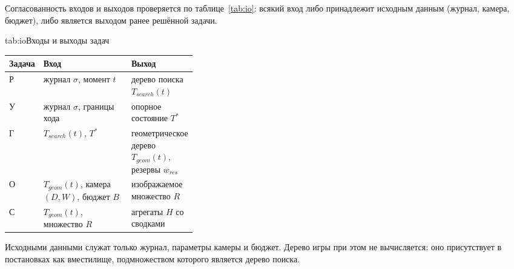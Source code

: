 Согласованность входов и выходов проверяется по таблице~\ref{tab:io}: всякий
вход либо принадлежит исходным данным (журнал, камера, бюджет), либо
является выходом ранее решённой задачи.

\begin{gosttable}{tab:io}{Входы и выходы задач}
\begin{tabularx}{\linewidth}{>{\raggedright\arraybackslash}p{0.10\linewidth}>{\raggedright\arraybackslash}X>{\raggedright\arraybackslash}p{0.26\linewidth}}
\hline
Задача & Вход & Выход \\
\hline
Р & журнал $\sigma$, момент $t$ & дерево поиска $T_{search}(t)$ \\
\hline
У & журнал $\sigma$, границы хода & опорное состояние $T^{*}$ \\
\hline
Г & $T_{search}(t)$, $T^{*}$ & геометрическое дерево $T_{geom}(t)$,
резервы $w_{res}$ \\
\hline
О & $T_{geom}(t)$, камера $(D, W)$, бюджет $B$ & изображаемое множество $R$ \\
\hline
С & $T_{geom}(t)$, множество $R$ & агрегаты $H$ со сводками \\
\hline
\end{tabularx}
\end{gosttable}

Исходными данными служат только журнал, параметры камеры и бюджет. Дерево
игры при этом не вычисляется: оно присутствует в постановках как
вместилище, подмножеством которого является дерево поиска.
